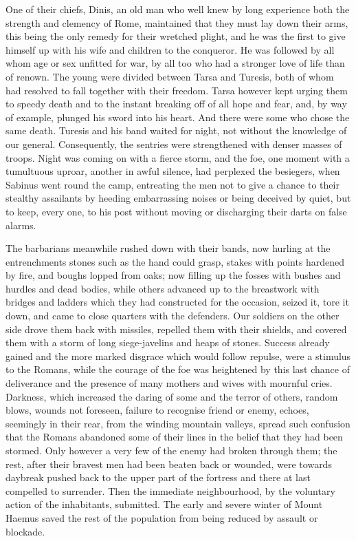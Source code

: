 
One of their chiefs, Dinis, an old man who well knew by long experience both the strength and clemency of Rome, maintained that they must lay down their arms, this being the only remedy for their wretched plight, and he was the first to give himself up with his wife and children to the conqueror. He was followed by all whom age or sex unfitted for war, by all too who had a stronger love of life than of renown. The young were divided between Tarsa and Turesis, both of whom had resolved to fall together with their freedom. Tarsa however kept urging them to speedy death and to the instant breaking off of all hope and fear, and, by way of example, plunged his sword into his heart. And there were some who chose the same death. Turesis and his band waited for night, not without the knowledge of our general. Consequently, the sentries were strengthened with denser masses of troops. Night was coming on with a fierce storm, and the foe, one moment with a tumultuous uproar, another in awful silence, had perplexed the besiegers, when Sabinus went round the camp, entreating the men not to give a chance to their stealthy assailants by heeding embarrassing noises or being deceived by quiet, but to keep, every one, to his post without moving or discharging their darts on false alarms.


The barbarians meanwhile rushed down with their bands, now hurling at the entrenchments stones such as the hand could grasp, stakes with points hardened by fire, and boughs lopped from oaks; now filling up the fosses with bushes and hurdles and dead bodies, while others advanced up to the breastwork with bridges and ladders which they had constructed for the occasion, seized it, tore it down, and came to close quarters with the defenders. Our soldiers on the other side drove them back with missiles, repelled them with their shields, and covered them with a storm of long siege-javelins and heaps of stones. Success already gained and the more marked disgrace which would follow repulse, were a stimulus to the Romans, while the courage of the foe was heightened by this last chance of deliverance and the presence of many mothers and wives with mournful cries. Darkness, which increased the daring of some and the terror of others, random blows, wounds not foreseen, failure to recognise friend or enemy, echoes, seemingly in their rear, from the winding mountain valleys, spread such confusion that the Romans abandoned some of their lines in the belief that they had been stormed. Only however a very few of the enemy had broken through them; the rest, after their bravest men had been beaten back or wounded, were towards daybreak pushed back to the upper part of the fortress and there at last compelled to surrender. Then the immediate neighbourhood, by the voluntary action of the inhabitants, submitted. The early and severe winter of Mount Haemus saved the rest of the population from being reduced by assault or blockade.

